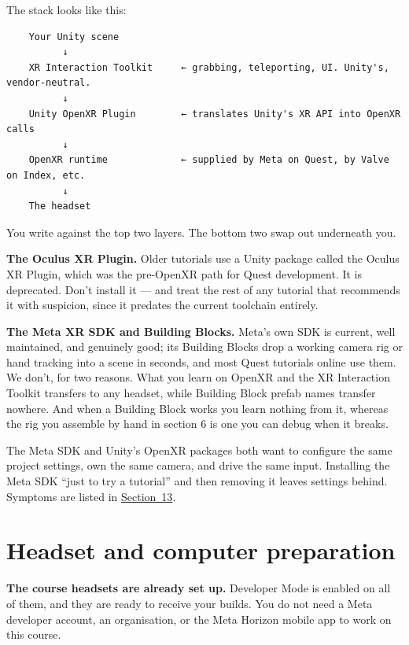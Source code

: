 \documentclass[11pt,a4paper]{article}
\begin{document}
The stack looks like this:

\begin{verbatim}
    Your Unity scene
          ↓
    XR Interaction Toolkit     ← grabbing, teleporting, UI. Unity's, vendor-neutral.
          ↓
    Unity OpenXR Plugin        ← translates Unity's XR API into OpenXR calls
          ↓
    OpenXR runtime             ← supplied by Meta on Quest, by Valve on Index, etc.
          ↓
    The headset
\end{verbatim}

You write against the top two layers. The bottom two swap out underneath you.

\textbf{The Oculus XR Plugin.} Older tutorials use a Unity package called the Oculus XR
Plugin, which was the pre-OpenXR path for Quest development. It is deprecated. Don't
install it --- and treat the rest of any tutorial that recommends it with suspicion, since
it predates the current toolchain entirely.

\textbf{The Meta XR SDK and Building Blocks.} Meta's own SDK is current, well maintained, and
genuinely good; its Building Blocks drop a working camera rig or hand tracking into a
scene in seconds, and most Quest tutorials online use them. We don't, for two reasons.
What you learn on OpenXR and the XR Interaction Toolkit transfers to any headset, while
Building Block prefab names transfer nowhere. And when a Building Block works you learn
nothing from it, whereas the rig you assemble by hand in section 6 is one you can debug
when it breaks.

\begin{warnbox}
The Meta SDK and Unity's OpenXR packages both want to
configure the same project settings, own the same camera, and drive the same input.
Installing the Meta SDK ``just to try a tutorial'' and then removing it leaves settings
behind. Symptoms are listed in \hyperref[troubleshooting]{Section~13}.
\end{warnbox}


\section{Headset and computer preparation}\label{headset-and-computer-preparation}

\textbf{The course headsets are already set up.} Developer Mode is enabled on all of them, and
they are ready to receive your builds. You do not need a Meta developer account, an
organisation, or the Meta Horizon mobile app to work on this course.
\end{document}
